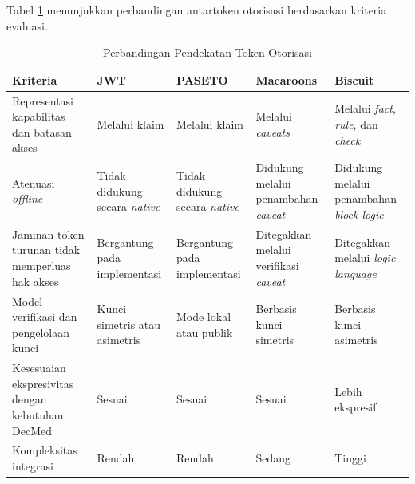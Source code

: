 \documentclass[bahasa, 12pt, a4paper, onecolumn, oneside, final]{report}
\begin{document}
Tabel \ref{tab:perbandingan-token-otorisasi} menunjukkan perbandingan antartoken otorisasi berdasarkan kriteria evaluasi.

\begin{table}[!ht]
	\centering
	\caption{Perbandingan Pendekatan Token Otorisasi}
	\label{tab:perbandingan-token-otorisasi}
	\scriptsize
	\begin{tabular}{|p{}|p{}|p{}|p{}|p{}|}
		\hline
		\textbf{Kriteria} & \textbf{JWT}                                             & \textbf{PASETO} & \textbf{Macaroons} & \textbf{Biscuit} \\ \hline
		Representasi kapabilitas dan batasan akses
		                  & Melalui klaim
		                  & Melalui klaim
		                  & Melalui \textit{caveats}
		                  & Melalui \textit{fact}, \textit{rule}, dan \textit{check}                                                           \\ \hline

		Atenuasi \textit{offline}
		                  & Tidak didukung secara \textit{native}
		                  & Tidak didukung secara \textit{native}
		                  & Didukung melalui penambahan \textit{caveat}
		                  & Didukung melalui penambahan \textit{block logic}                                                                   \\ \hline

		Jaminan token turunan tidak memperluas hak akses
		                  & Bergantung pada implementasi
		                  & Bergantung pada implementasi
		                  & Ditegakkan melalui verifikasi \textit{caveat}
		                  & Ditegakkan melalui \textit{logic language}                                                                         \\ \hline

		Model verifikasi dan pengelolaan kunci
		                  & Kunci simetris atau asimetris
		                  & Mode lokal atau publik
		                  & Berbasis kunci simetris
		                  & Berbasis kunci asimetris                                                                                           \\ \hline

		Kesesuaian ekspresivitas dengan kebutuhan DecMed
		                  & Sesuai
		                  & Sesuai
		                  & Sesuai
		                  & Lebih ekspresif                                                                                                    \\ \hline

		Kompleksitas integrasi
		                  & Rendah
		                  & Rendah
		                  & Sedang
		                  & Tinggi                                                                                                             \\ \hline
	\end{tabular}

\end{table}
\end{document}
